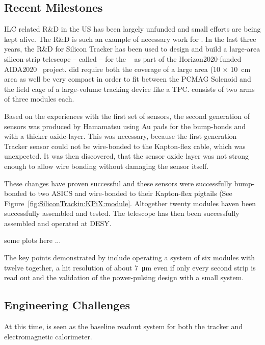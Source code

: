 \subsection{Recent Milestones}
ILC related R\&D in the US has been largely unfunded and small efforts are being kept alive. The \KPIX R\&D is such an example of necessary work for \SID.
In the last three years, the R\&D for \KPIX Silicon Tracker has been used to design and build a large-area silicon-strip 
telescope -- called \LYCORIS -- for the \DIITBF~\cite{desytb2018} as part of the Horizon2020-funded AIDA2020~\cite{AIDA2020} project.
\LYCORIS did require both the coverage of a large area (10 $\times$ \SI{10}{\centi\meter} area as well be very compact in order to fit
between the PCMAG Solenoid and the field cage of a large-volume tracking device like a TPC. \LYCORIS consists of two arms of three modules each.

Based on the experiences with the first set of sensors, the second generation of sensors was produced by Hamamatsu 
using Au pads for the \KPIX bump-bonds and with a thicker oxide-layer. This was necessary, because the first generation Tracker sensor could not be 
wire-bonded to the Kapton-flex cable, which was unexpected. It was then discovered, that the sensor oxide layer was not strong enough 
to allow wire bonding without damaging the sensor itself.

These changes have proven successful and these sensors were successfully bump-bonded to two \KPIX ASICS and wire-bonded to their Kapton-flex pigtails 
(See Figure~\ref{fig:SiliconTrackin:KPiX:module}. Altogether twenty modules haven been successfully assembled and tested. 
The \LYCORIS telescope has then been successfully assembled and operated at DESY. 



some plots here ...

The key points demonstrated by \LYCORIS include operating a system of six modules with twelve \KPIX together, 
a hit resolution of about \SI{7}{\micro\meter} even if only every second strip is read out and the 
validation of the power-pulsing design with a small system. 



\subsection{Engineering Challenges}
At this time, \KPIX is seen as the baseline readout system for both the \SID tracker and electromagnetic calorimeter. 

